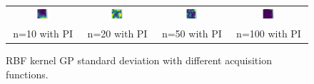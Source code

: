 \documentclass[11pt]{article}
\begin{document}
\begin{figure}[H]
\begin{tabular}{cccc}
        \includegraphics[width=0.225\textwidth]{../Task-02/plots/gp_std_rbf_n10_PI.png} &
        \includegraphics[width=0.225\textwidth]{../Task-02/plots/gp_std_rbf_n20_PI.png} &
        \includegraphics[width=0.225\textwidth]{../Task-02/plots/gp_std_rbf_n50_PI.png} &
        \includegraphics[width=0.225\textwidth]{../Task-02/plots/gp_std_rbf_n100_PI.png} \\
        n=10 with PI & n=20 with PI & n=50 with PI & n=100 with PI \\
    \end{tabular}
    \caption{RBF kernel GP standard deviation with different acquisition functions.}
    \label{fig:rbf_gp_std}
\end{figure}
\end{document}
